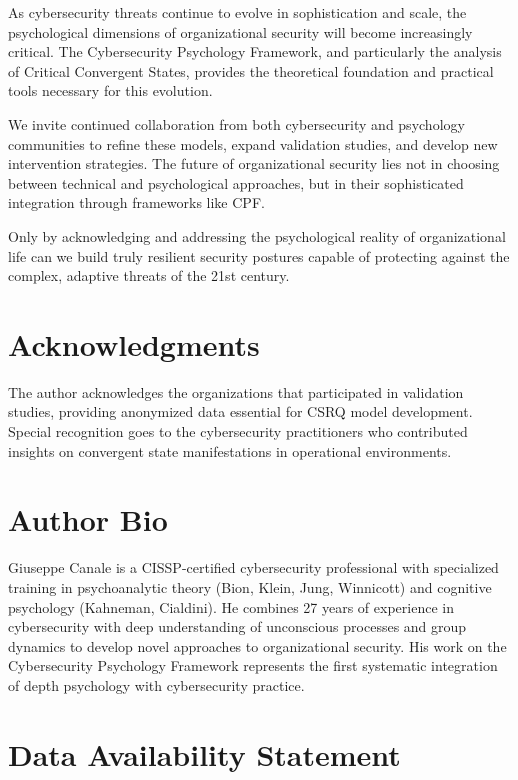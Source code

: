 \documentclass[11pt,a4paper]{article}
\begin{document}
As cybersecurity threats continue to evolve in sophistication and scale, the psychological dimensions of organizational security will become increasingly critical. The Cybersecurity Psychology Framework, and particularly the analysis of Critical Convergent States, provides the theoretical foundation and practical tools necessary for this evolution.

We invite continued collaboration from both cybersecurity and psychology communities to refine these models, expand validation studies, and develop new intervention strategies. The future of organizational security lies not in choosing between technical and psychological approaches, but in their sophisticated integration through frameworks like CPF.

Only by acknowledging and addressing the psychological reality of organizational life can we build truly resilient security postures capable of protecting against the complex, adaptive threats of the 21st century.

\section*{Acknowledgments}

The author acknowledges the organizations that participated in validation studies, providing anonymized data essential for CSRQ model development. Special recognition goes to the cybersecurity practitioners who contributed insights on convergent state manifestations in operational environments.

\section*{Author Bio}

Giuseppe Canale is a CISSP-certified cybersecurity professional with specialized training in psychoanalytic theory (Bion, Klein, Jung, Winnicott) and cognitive psychology (Kahneman, Cialdini). He combines 27 years of experience in cybersecurity with deep understanding of unconscious processes and group dynamics to develop novel approaches to organizational security. His work on the Cybersecurity Psychology Framework represents the first systematic integration of depth psychology with cybersecurity practice.

\section*{Data Availability Statement}
\end{document}
